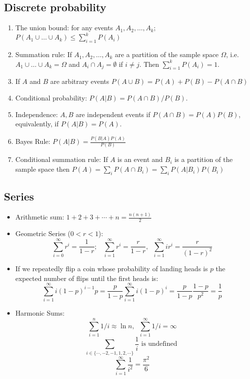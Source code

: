 \documentclass[10pt,twocolumn]{article}
\begin{document}
\subsection*{Discrete probability}
\begin{enumerate}
\item The union bound: for any events $A_1,A_2,\ldots,A_k$;
$ P(A_1\cup \ldots \cup A_k) \leq \sum_{i=1}^k P(A_i) $
\item Summation rule: If $A_1,A_2,\ldots,A_k$ are a partition of
  the sample space $\Omega$, i.e. $A_1 \cup \ldots \cup A_k = \Omega$
  and $A_i \cap A_j= \emptyset$ if $i \neq j$. Then $\sum_{i=1}^k
  P(A_i)=1$.
\item If $A$ and $B$ are arbitrary events $P(A \cup B) = P(A)+P(B)-P(A \cap
B)$
\item Conditional probability: $P(A|B)=P(A \cap B)/P(B)$.
\item Independence: $A,B$ are independent events if $P(A\cap
  B)=P(A)P(B)$, equivalently, if $P(A|B)=P(A)$.
\item Bayes Rule: $P(A|B) = \frac{P(B|A)P(A)}{P(B)}$
\item Conditional summation rule: If $A$ is an event and $B_i$ is a
  partition of the sample space then $P(A) = \sum_i P(A \cap
  B_i)=\sum_i P(A|B_i) P(B_i)$
\end{enumerate}

\subsection*{Series}
\begin{itemize}
\item Arithmetic sum: $1+2+3+\cdots+n = \frac{n(n+1)}{2}$

\item Geometric Series ($0<r<1$):
\[
\sum_{i=0}^\infty r^i = \frac{1}{1-r};\;\;\;
\sum_{i=1}^\infty r^i = \frac{r}{1-r},\;\; \sum_{i=1}^\infty ir^i = \frac{r}{(1-r)^2}
\]
\item
If we repeatedly flip a coin whose probability of landing heads is $p$
the expected number of flips until the first heads is:
\[
\sum_{i=1}^\infty i (1-p)^{i-1}p =\frac{p}{1-p} \sum_{i=1}^\infty i
(1-p)^i
=
\frac{p}{1-p}\frac{1-p}{p^2}=\frac{1}{p}
\]
\item Harmonic Sums: 
\[
\sum_{i=1}^n 1/i \approx \ln n,\;\; \sum_{i=1}^\infty 1/i =\infty
\]
\[
\sum_{i\in \{\cdots,-2,-1, 1,2,\cdots\}} \frac{1}{i} \mbox{ is undefined }
\]
\[
\sum_{i=1}^{\infty} \frac{1}{i^2}=\frac{\pi^2}{6}
\]
\end{itemize}
\end{document}
